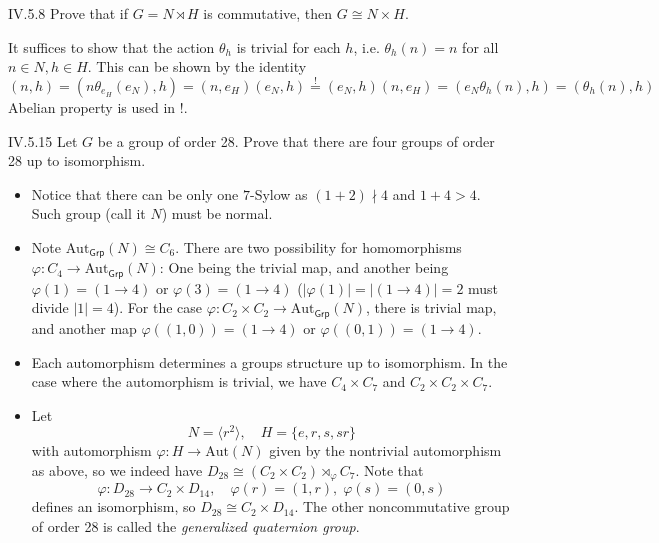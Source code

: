 \begin{problem}{IV.5.8}
Prove that if $G = N \rtimes H$ is commutative, then $G \cong N \times H$.
\end{problem}
\begin{pf}
It suffices to show that the action $\theta_h$ is trivial for each $h$, i.e. $\theta_h(n) = n$ for all $n \in N, h \in H$. This can be shown by the identity
\[
(n,h) = (n\theta_{e_H}(e_N), h) = (n,e_H)(e_N,h) \overset{!}{=} (e_N,h)(n,e_H) = (e_N\theta_h(n), h) = (\theta_h(n), h)
\]
Abelian property is used in !.
\end{pf}

\begin{problem}{IV.5.15}
Let $G$ be a group of order 28. Prove that there are four groups of order 28 up to isomorphism.
\end{problem}
\begin{pf}
\begin{itemize}
	\setlength\itemsep{0pt}
	\item Notice that there can be only one $7$-Sylow as $(1+2)\nmid 4$ and $1 + 4 > 4$. Such group (call it $N$) must be normal.
	\item Note $\text{Aut}_\mathsf{Grp}(N) \cong C_6 $. There are two possibility for homomorphisms $\varphi : C_4 \to \text{Aut}_\mathsf{Grp}(N)$: One being the trivial map, and another being $\varphi(1) = (1 \to 4)$ or $\varphi(3) = (1 \to 4)$ ($|\varphi(1)| = |(1 \to 4)| = 2$ must divide $|1| = 4$). For the case $\varphi : C_2 \times C_2 \to \text{Aut}_\mathsf{Grp}(N)$, there is trivial map, and another map $\varphi((1,0)) = (1 \to 4)$ or $\varphi((0,1)) = (1 \to 4)$.
	\item Each automorphism determines a groups structure up to isomorphism. In the case where the automorphism is trivial, we have $C_4 \times C_7$ and $C_2 \times C_2 \times C_7$.
	\item Let
	\[
	N = \langle r^2 \rangle, \quad H = \{e,r,s,sr\}	
	\]
	with automorphism $\varphi: H \to \text{Aut}(N)$ given by the nontrivial automorphism as above, so we indeed have $D_{28} \cong (C_2 \times C_2) \rtimes_\varphi C_7$. Note that
	\[
	\varphi: D_{28} \to C_2 \times D_{14}, \quad \varphi(r) = (1,r), \;\varphi(s) = (0,s)
	\]
	defines an isomorphism, so $D_{28} \cong C_2 \times D_{14}$. The other noncommutative group of order 28 is called the \emph{generalized quaternion group}.
\end{itemize}
\end{pf}

\section{}

